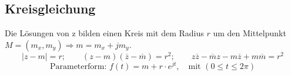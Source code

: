 %	
%
%
 
\subsection{Kreisgleichung}
Die Lösungen von z bilden einen Kreis mit dem Radius $r$ um den Mittelpunkt $M=(m_x, m_y) \Rightarrow m=m_x + j m_y$. \\
$$|z-m| = r; \qquad 
(z-m)(\overline{z} - \overline{m}) = r^2; \qquad 
z\overline{z} - \overline{m}z - m\overline{z} + m\overline{m} = r^2$$
$$ \text{Parameterform: } f(t) = m + r \cdot e^{jt}, \quad \text{mit } (0 \leq t \leq 2 \pi) $$


